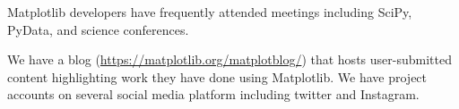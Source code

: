 \documentclass[12pt]{article}
\numberwithin{page}{section}
\begin{document}
Matplotlib developers have frequently attended meetings including
SciPy, PyData, and science conferences.

We have a blog (\url{https://matplotlib.org/matplotblog/}) that hosts
user-submitted content highlighting work they have done using
Matplotlib.  We have project accounts on several social media platform
including twitter and Instagram.




\newpage

\def\ref@jnl#1{{\rm#1}}

\def\aj{\ref@jnl{AJ}}                   %
\def\actaa{\ref@jnl{Acta Astron.}}      %
\def\araa{\ref@jnl{ARA\&A}}             %
\def\apj{\ref@jnl{ApJ}}                 %
\def\apjl{\ref@jnl{ApJ}}                %
\def\apjs{\ref@jnl{ApJS}}               %
\def\ao{\ref@jnl{Appl.~Opt.}}           %
\def\apss{\ref@jnl{Ap\&SS}}             %
\def\aap{\ref@jnl{A\&A}}                %
\def\aapr{\ref@jnl{A\&A~Rev.}}          %
\def\aaps{\ref@jnl{A\&AS}}              %
\def\azh{\ref@jnl{AZh}}                 %
\def\baas{\ref@jnl{BAAS}}               %
\def\bac{\ref@jnl{Bull. astr. Inst. Czechosl.}}
\def\caa{\ref@jnl{Chinese Astron. Astrophys.}}
\def\cjaa{\ref@jnl{Chinese J. Astron. Astrophys.}}
\def\icarus{\ref@jnl{Icarus}}           %
\def\jcap{\ref@jnl{J. Cosmology Astropart. Phys.}}
\def\jrasc{\ref@jnl{JRASC}}             %
\def\memras{\ref@jnl{MmRAS}}            %
\def\mnras{\ref@jnl{MNRAS}}             %
\def\na{\ref@jnl{New A}}                %
\def\nar{\ref@jnl{New A Rev.}}          %
\def\pra{\ref@jnl{Phys.~Rev.~A}}        %
\def\prb{\ref@jnl{Phys.~Rev.~B}}        %
\def\prc{\ref@jnl{Phys.~Rev.~C}}        %
\def\prd{\ref@jnl{Phys.~Rev.~D}}        %
\end{document}
